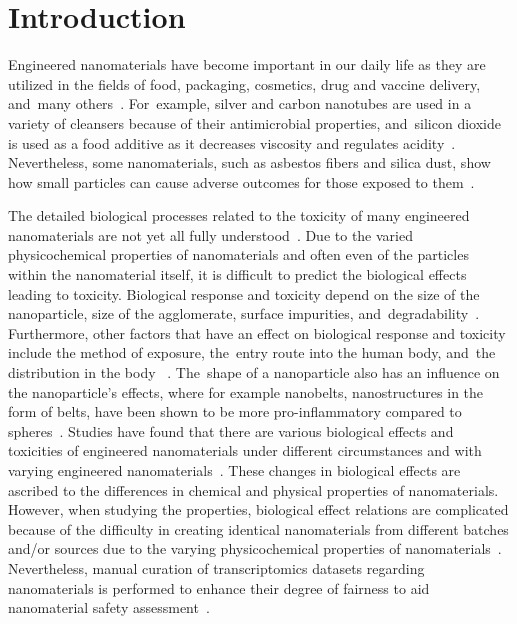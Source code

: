 \documentclass[ijms,article,accept,moreauthors,pdftex]{Definitions/mdpi}
\begin{document}
\section{Introduction}

Engineered nanomaterials have become important in our daily life as they are utilized in the fields of food, packaging, cosmetics, drug and vaccine delivery, and~many others~\cite{Ray2009}. For~example, silver and carbon nanotubes are used in a variety of cleansers because of their antimicrobial properties, and~silicon dioxide is used as a food additive as it decreases viscosity and regulates acidity~\cite{Shin2015}. Nevertheless, some nanomaterials, such as asbestos fibers and silica dust, show how small particles can cause adverse outcomes for those exposed to them~\cite{Visona2018,Markowitz2015,Chen2012,Arnoldussen2019}.

The detailed biological processes related to the toxicity of many engineered nanomaterials are not yet all fully understood~\cite{Podila2012,Bahadar2016}. Due to the varied physicochemical properties of nanomaterials and often even of the particles within the nanomaterial itself, it is difficult to predict the biological effects leading to toxicity. Biological response and toxicity depend on the size of the nanoparticle, size of the agglomerate, surface impurities, and~degradability~\cite{DeStefano2012}. Furthermore, other factors that have an effect on biological response and toxicity include the method of exposure, the~entry route into the human body, and~the distribution in the body ~\cite{Shin2015}. %
The~shape of a nanoparticle also has an influence on the nanoparticle’s effects, where for example nanobelts, nanostructures in the form of belts, have been shown to be more pro-inflammatory compared to spheres~\cite{Silva2013}. Studies have found that there are various biological effects and toxicities of engineered nanomaterials under different circumstances and with varying engineered nanomaterials~\cite{Ray2009,Atha2017,Donaldson2003,Sung2008,EbabeElle2013}. These changes in biological effects are ascribed to the differences in chemical and physical properties of nanomaterials. However, when studying the properties, biological effect relations are complicated because of the difficulty in creating identical nanomaterials from different batches and/or sources due to the varying physicochemical properties of nanomaterials~\cite{Mulhopt2018}. %
Nevertheless, manual curation of transcriptomics datasets regarding nanomaterials is performed to enhance their degree of 
fairness  %
to aid nanomaterial safety assessment~\cite{AliisaSaarimaki}.  
\end{document}
